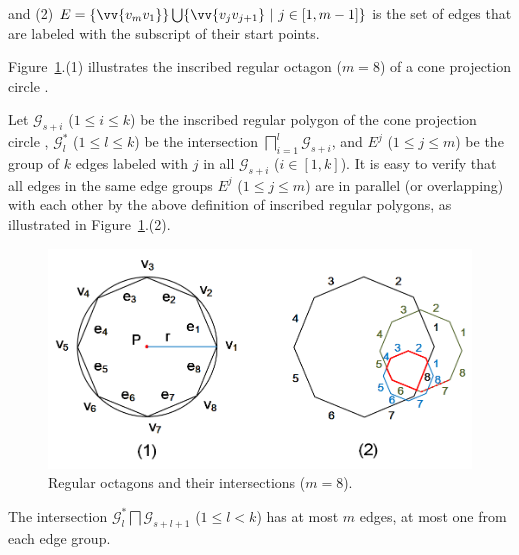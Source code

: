 \ni and (2) $E= \{\vv{v_mv_1}\} \bigcup \{\vv{v_jv_{j+1}}\ |\ j\in [1, m-1]\}$ is the set of edges that are labeled with the subscript of their start points.


Figure~\ref{fig:polygons}.(1) illustrates the inscribed regular octagon ($m=8$) of a cone projection circle .

Let $\mathcal{G}_{s+i}$ ($1\le i \le k$) be the inscribed regular polygon of the cone projection  circle ,
$\mathcal{G}^*_l$ ($1\le l\le k$) be the intersection $\bigsqcap_{i=1}^{l}\mathcal{G}_{s+i}$,
and $E^j$ ($1\le j \le m$) be the group of $k$ edges labeled with $j$ in all $\mathcal{G}_{s+i}$ ($i\in[1, k]$).
%
It is easy to verify that all edges in the same edge groups $E^j$ ($1\le j\le m$) are in parallel (or overlapping) with each other by the above definition of inscribed regular polygons, as illustrated in Figure~\ref{fig:polygons}.(2).






\begin{figure}[tb!]
\centering
\includegraphics[scale=0.86]{figures/Fig-polygons.png}
\vspace{-2ex}
\caption{\small Regular octagons and their intersections ($m =8$).}
\vspace{-3ex}
\label{fig:polygons}
\end{figure}


\begin{prop}
\label{prop-rp-intersection}
The intersection $\mathcal{G}^*_{l} \bigsqcap \mathcal{G}_{s+l+1}$ ($ 1\le l< k$) has at most $m$ edges, \ie at most one from each edge group.
\end{prop}



